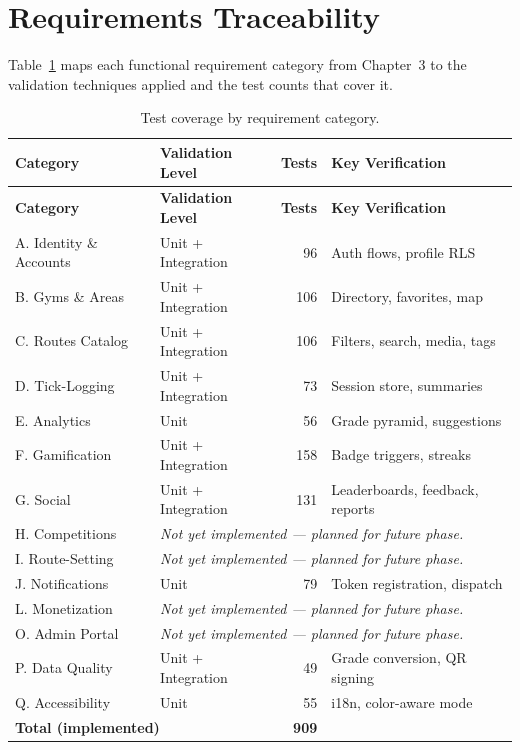 \documentclass[12pt,a4paper]{report}
\renewcommand\_{\textunderscore\hspace{0pt}}
\begin{document}
\section{Requirements Traceability}

Table~\ref{tab:test-traceability} maps each functional requirement category from Chapter~3 to the validation techniques applied and the test counts that cover it.

\begin{longtable}{l l r l}
\caption{Test coverage by requirement category.}\label{tab:test-traceability}\\
\hline
\textbf{Category} & \textbf{Validation Level} & \textbf{Tests} & \textbf{Key Verification} \\
\hline
\endfirsthead
\hline
\textbf{Category} & \textbf{Validation Level} & \textbf{Tests} & \textbf{Key Verification} \\
\hline
\endhead

A. Identity \& Accounts & Unit + Integration & 96 & Auth flows, profile RLS \\
B. Gyms \& Areas & Unit + Integration & 106 & Directory, favorites, map \\
C. Routes Catalog & Unit + Integration & 106 & Filters, search, media, tags \\
D. Tick-Logging & Unit + Integration & 73 & Session store, summaries \\
E. Analytics & Unit & 56 & Grade pyramid, suggestions \\
F. Gamification & Unit + Integration & 158 & Badge triggers, streaks \\
G. Social & Unit + Integration & 131 & Leaderboards, feedback, reports \\
H. Competitions & \multicolumn{3}{l}{\textit{Not yet implemented --- planned for future phase.}} \\
I. Route-Setting & \multicolumn{3}{l}{\textit{Not yet implemented --- planned for future phase.}} \\
J. Notifications & Unit & 79 & Token registration, dispatch \\
L. Monetization & \multicolumn{3}{l}{\textit{Not yet implemented --- planned for future phase.}} \\
O. Admin Portal & \multicolumn{3}{l}{\textit{Not yet implemented --- planned for future phase.}} \\
P. Data Quality & Unit + Integration & 49 & Grade conversion, QR signing \\
Q. Accessibility & Unit & 55 & i18n, color-aware mode \\
\hline
\multicolumn{2}{l}{\textbf{Total (implemented)}} & \textbf{909} & \\
\hline
\end{longtable}
\end{document}
